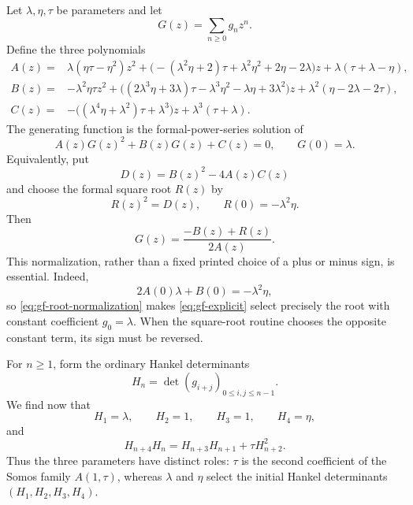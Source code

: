 \documentclass[11pt]{article}
\theoremstyle{remark}
\begin{document}
Let $\lambda,\eta,\tau$ be parameters and let
\[
 G(z)=\sum_{n\geq0}g_nz^n.
\]
Define the three polynomials
\begin{align}
 A(z)={}&\lambda(\eta\tau-\eta^2)z^2
 +\bigl(-(\lambda^2\eta+2)\tau
       +\lambda^2\eta^2+2\eta-2\lambda\bigr)z
 +\lambda(\tau+\lambda-\eta),                                      \label{eq:gf-A}\\
 B(z)={}&-\lambda^2\eta\tau z^2
 +\bigl((2\lambda^3\eta+3\lambda)\tau
       -\lambda^3\eta^2-\lambda\eta+3\lambda^2\bigr)z
 +\lambda^2(\eta-2\lambda-2\tau),                                  \label{eq:gf-B}\\
 C(z)={}&-\bigl((\lambda^4\eta+\lambda^2)\tau+\lambda^3\bigr)z
 +\lambda^3(\tau+\lambda).                                         \label{eq:gf-C}
\end{align}
The generating function is the formal-power-series solution of
\begin{equation}
 A(z)G(z)^2+B(z)G(z)+C(z)=0,
 \qquad G(0)=\lambda.                                                \label{eq:gf-quadratic}
\end{equation}
Equivalently, put
\[
 D(z)=B(z)^2-4A(z)C(z)
\]
and choose the formal square root $R(z)$ by
\begin{equation}
 R(z)^2=D(z),\qquad R(0)=-\lambda^2\eta.                             \label{eq:gf-root-normalization}
\end{equation}
Then
\begin{equation}
 \boxed{\displaystyle
 G(z)=\frac{-B(z)+R(z)}{2A(z)}.}                                     \label{eq:gf-explicit}
\end{equation}
This normalization, rather than a fixed printed choice of a plus or minus
sign, is essential.  Indeed,
\[
 2A(0)\lambda+B(0)=-\lambda^2\eta,
\]
so \eqref{eq:gf-root-normalization} makes
\eqref{eq:gf-explicit} select precisely the root with constant coefficient
$g_0=\lambda$.  When the square-root routine chooses the opposite constant
term, its sign must be reversed. 

For $n\geq1$, form the ordinary Hankel determinants
\begin{equation}
 H_n=\det(g_{i+j})_{0\leq i,j\leq n-1}.                              \label{eq:gf-Hankel}
\end{equation}
We find now that
\begin{equation}
 H_1=\lambda,\qquad H_2=1,\qquad H_3=1,\qquad H_4=\eta,              \label{eq:gf-initial-Hankel}
\end{equation}
and 
\begin{equation}
 H_{n+4}H_n=H_{n+3}H_{n+1}+\tau H_{n+2}^2.                           \label{eq:gf-Somos}
\end{equation}
Thus the three parameters have distinct roles: $\tau$ is the second
coefficient of the Somos family $A(1,\tau)$, whereas $\lambda$ and $\eta$
select the initial Hankel determinants $(H_1,H_2,H_3,H_4)$.
\end{document}
